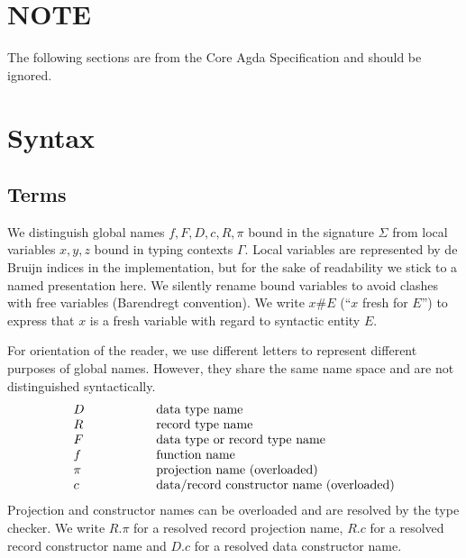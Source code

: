 \documentclass[acmlarge,fleqn]{acmart}\settopmatter{}
\begin{document}
\iffalse
\section{NOTE}

The following sections are from the Core Agda Specification and should be ignored.

\section{Syntax}
\label{sec:syntax}

\subsection{Terms}

We distinguish global names $f,F,D,c,R,\pi$ bound in the signature $\Sigma$ from
local variables $x,y,z$ bound in typing contexts $\Gamma$.  Local
variables are represented by de Bruijn indices in the implementation,
but for the sake of readability we stick to a named presentation here.
We silently rename bound variables to avoid clashes with free variables
(Barendregt convention).  We write $x \# E$ (``$x$ fresh for $E$'')
to express that $x$ is a
fresh variable with regard to syntactic entity $E$.

For orientation of the reader, we use different letters to represent
different purposes of global names.  However, they share the same name
space and are not distinguished syntactically.
\[
\begin{array}{l@{\hspace{2cm}}l}
  D & \text{data type name} \\
  R & \text{record type name} \\
  F & \text{data type or record type name} \\
  f & \text{function name} \\
\pi & \text{projection name  (overloaded)} \\
  c & \text{data/record constructor name (overloaded)} \\
\end{array}
\]
Projection and constructor names can be overloaded and are resolved by
the type checker.  We write $R.\pi$ for a resolved record projection
name, $R.c$ for a resolved record constructor name and $D.c$ for a
resolved data constructor name.
\end{document}
